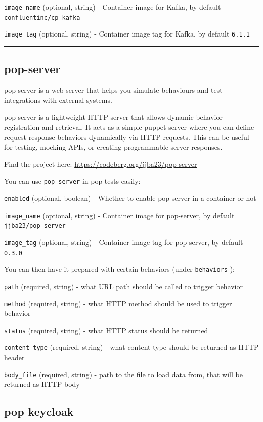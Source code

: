 \documentclass[11pt]{article}
\begin{document}
\texttt{image\_name} (optional, string) - Container image for Kafka, by default \texttt{confluentinc/cp-kafka}

\texttt{image\_tag} (optional, string) - Container image tag for Kafka, by default \texttt{6.1.1}


\noindent\rule{\textwidth}{0.5pt}

\subsection{pop-server}
\label{sec:org2b6eaad}

pop-server is a web-server that helps you simulate behaviours and test integrations with external systems.

pop-server is a lightweight HTTP server that allows dynamic behavior registration and retrieval. It acts as a simple puppet server where you can define request-response behaviors dynamically via HTTP requests. This can be useful for testing, mocking APIs, or creating programmable server responses.

Find the project here: \url{https://codeberg.org/jjba23/pop-server}

You can use \texttt{pop\_server} in pop-tests easily:

\texttt{enabled} (optional, boolean) - Whether to enable pop-server in a container or not

\texttt{image\_name} (optional, string) - Container image for pop-server, by default \texttt{jjba23/pop-server}

\texttt{image\_tag} (optional, string) - Container image tag for pop-server, by default \texttt{0.3.0}


You can then  have it prepared with certain behaviors (under \texttt{behaviors} ):

\texttt{path} (required, string) - what URL path should be called to trigger behavior

\texttt{method} (required, string) - what HTTP method should be used to trigger behavior

\texttt{status} (required, string) - what HTTP status should be returned

\texttt{content\_type} (required, string) - what content type should be returned as HTTP header

\texttt{body\_file} (required, string) - path to the file to load data from, that will be returned as HTTP body


\subsection{pop keycloak}
\label{sec:org3e11599}
\end{document}

